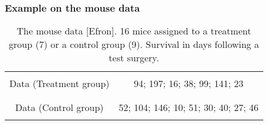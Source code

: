 \frame
{
\frametitle{Example on the mouse data}

\begin{table}[!h]
\begin{tabular}{|c|c|}
\hline
&\\
 Data (Treatment group) & 94; 197; 16; 38; 99; 141; 23 \\
&\\
\hline
& \\
Data (Control group) & 52; 104; 146; 10; 51; 30; 40; 27; 46 \\
& \\
\hline
\end{tabular}
\caption{The mouse data [Efron]. 16 mice  assigned to a treatment group (7) or a control group (9). Survival in days following a test surgery.  }
\end{table}



}

